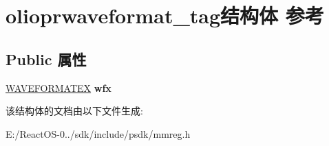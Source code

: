 \hypertarget{structolioprwaveformat__tag}{}\section{olioprwaveformat\+\_\+tag结构体 参考}
\label{structolioprwaveformat__tag}
\subsection*{Public 属性}
\begin{DoxyCompactItemize}
\item 
\mbox{\label{structolioprwaveformat__tag_a6aeab86a643cc2b4ab56e485ea2c08d6}} 
\hyperlink{struct_w_a_v_e_f_o_r_m_a_t_e_x}{W\+A\+V\+E\+F\+O\+R\+M\+A\+T\+EX} {\bfseries wfx}
\end{DoxyCompactItemize}


该结构体的文档由以下文件生成\+:\begin{DoxyCompactItemize}
\item 
E\+:/\+React\+O\+S-\/0../sdk/include/psdk/mmreg.\+h\end{DoxyCompactItemize}
